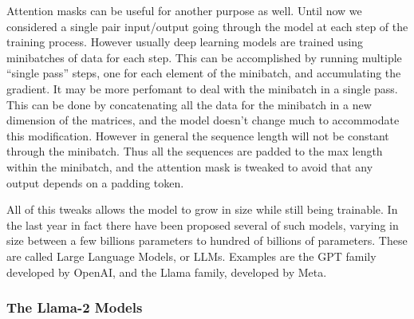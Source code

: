 \documentclass[]{marticle}
\begin{document}
Attention masks can be useful for another purpose as well. Until now we considered a single pair
input/output going through the model at each step of the training process. However usually deep
learning models are trained using minibatches of data for each step. This can be accomplished by
running multiple ``single pass'' steps, one for each element of the minibatch, and accumulating the
gradient. It may be more perfomant to deal with the minibatch in a single pass. This can be done by
concatenating all the data for the minibatch in a new dimension of the matrices, and the model
doesn't change much to accommodate this modification. However in general the sequence length will not
be constant through the minibatch. Thus all the sequences are padded to the max length within the
minibatch, and the attention mask is tweaked to avoid that any output depends on a padding token.

All of this tweaks allows the model to grow in size while still being trainable. In the last year in
fact there have been proposed several of such models, varying in size between a few billions
parameters to hundred of billions of parameters. These are called Large Language Models, or LLMs.
Examples are the GPT family developed by OpenAI, and the Llama family, developed by Meta.

\subsubsection{The Llama-2 Models}
\end{document}
